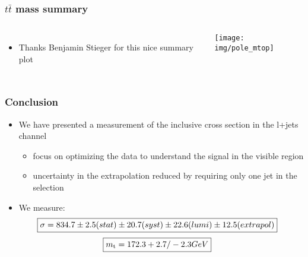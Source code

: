 \documentclass{beamer}
\begin{document}
\begin{frame}
\frametitle{$t\bar{t}$ mass summary}
\begin{columns}
\begin{itemize}
\item Thanks Benjamin Stieger for this nice summary plot
\end{itemize}
 \texttt{[image: img/pole\_mtop]}
\end{columns}
\end{frame}
\begin{frame}
\frametitle{Conclusion}
\begin{itemize}
\item We have presented a measurement of the inclusive cross section in the l+jets channel
\begin{itemize}
\item focus on optimizing the data to understand the signal in the visible region
\item uncertainty in the extrapolation reduced by requiring only one jet in the selection
\end{itemize}
\item We measure:
\begin{align}
\Aboxed{\sigma = 834.7 \pm 2.5 (stat) \pm 20.7 (syst) \pm 22.6 (lumi) \pm 12.5 (extrapol)}\nonumber
\end{align}
\vspace{-0.9cm}
\begin{align}
\Aboxed{m_\text{t} = 172.3 +2.7/-2.3 GeV}\nonumber
\end{align}
\end{itemize}
\end{frame}
\end{document}
